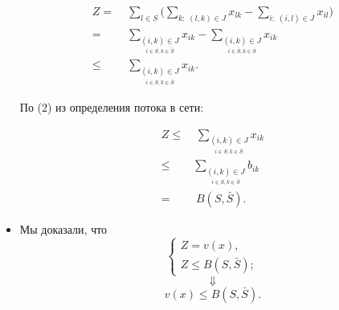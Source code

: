 \begin{itemize}[nosep]
	\begin{align*}
		Z =& \; \sum_{l \in S} \bigg(\sum_{k:\;(l, k) \in J} x_{lk} - \sum_{i: \; (i, l) \in J} x_{il}\bigg) \\
		=& \;  \sum_{\underset{i \in S, k \in \bar{S}}{(i, k) \in J}} x_{ik} - \sum_{\underset{i \in \bar{S}, k \in S}{(i, k) \in J}} x_{ik} \\
		\le& \; \sum_{\underset{i \in S, k \in \bar{S}}{(i, k) \in J}} x_{ik}.
	\end{align*}
	
	По (2) из определения потока в сети:
	
	\begin{align*}
		Z \le& \; \sum_{\underset{i \in S, k \in \bar{S}}{(i, k) \in J}} x_{ik} \\
		\le& \sum_{\underset{i \in S, k \in \bar{S}}{(i, k) \in J}} b_{ik} \\
		=& \; B(S, \bar{S}).
	\end{align*}
	
	\item[\fbox{3}] Мы доказали, что
	\[
	\begin{cases}
		Z = v(x), \\
		Z \le B(S, \bar{S}); 
	\end{cases}
	\]
	\[
	\Downarrow
	\]
	\[
	v(x) \le B(S, \bar{S}).
	\]
\end{itemize}

